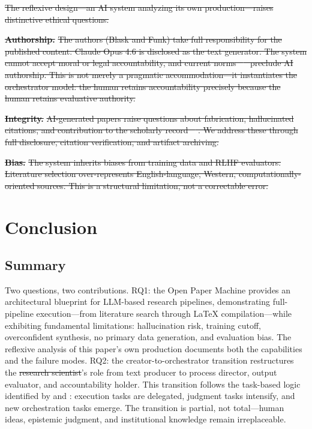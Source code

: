 \documentclass{article}
\providecommand{\DIFaddtex}[1]{{\protect\color{blue}\uwave{#1}}} %
\providecommand{\DIFdeltex}[1]{{\protect\color{red}\sout{#1}}}                      %
\providecommand{\DIFaddbegin}{} %
\providecommand{\DIFaddend}{} %
\providecommand{\DIFdelbegin}{} %
\providecommand{\DIFdelend}{} %
\providecommand{\DIFadd}[1]{\texorpdfstring{\DIFaddtex{#1}}{#1}} %
\providecommand{\DIFdel}[1]{\texorpdfstring{\DIFdeltex{#1}}{}} %
\newcommand{\DIFscaledelfig}{0.5}
\newlength{\DIFdelgraphicswidth} %
\newlength{\DIFdelgraphicsheight} %
\newcommand{\DIFaddincludegraphics}[2][]{{\color{blue}\fbox{\DIFOincludegraphics[#1]{#2}}}} %
\newcommand{\DIFdelincludegraphics}[2][]{%
\sbox{\DIFdelgraphicsbox}{\DIFOincludegraphics[#1]{#2}}%
\settoboxwidth{\DIFdelgraphicswidth}{\DIFdelgraphicsbox} %
\settoboxtotalheight{\DIFdelgraphicsheight}{\DIFdelgraphicsbox} %
\scalebox{\DIFscaledelfig}{%
\parbox[b]{\DIFdelgraphicswidth}{\usebox{\DIFdelgraphicsbox}\\[-\baselineskip] \rule{\DIFdelgraphicswidth}{0em}}\llap{\resizebox{\DIFdelgraphicswidth}{\DIFdelgraphicsheight}{%
\setlength{\unitlength}{\DIFdelgraphicswidth}%
\begin{picture}(1,1)%
\thicklines\linethickness{2pt} %
{\color[rgb]{1,0,0}\put(0,0){\framebox(1,1){}}}%
{\color[rgb]{1,0,0}\put(0,0){\line( 1,1){1}}}%
{\color[rgb]{1,0,0}\put(0,1){\line(1,-1){1}}}%
\end{picture}%
}\hspace*{3pt}}} %
} %
\DeclareRobustCommand{\DIFaddbegin}{\DIFOaddbegin \let\includegraphics\DIFaddincludegraphics} %
\DeclareRobustCommand{\DIFaddend}{\DIFOaddend \let\includegraphics\DIFOincludegraphics} %
\DeclareRobustCommand{\DIFdelbegin}{\DIFOdelbegin \let\includegraphics\DIFdelincludegraphics} %
\DeclareRobustCommand{\DIFdelend}{\DIFOaddend \let\includegraphics\DIFOincludegraphics} %
\begin{document}
\DIFdelbegin \DIFdel{The reflexive design---an AI system analyzing its own production---raises distinctive ethical questions.
}%

\textbf{\DIFdel{Authorship.}} %
\DIFdel{The authors (Blask and Funk) take full responsibility for the published content. Claude Opus 4.6 is disclosed as the text generator. The system cannot accept moral or legal accountability, and current norms \mbox{%
\citep{flanagin2023nonhuman} }\hskip0pt%
preclude AI authorship. This is not merely a pragmatic accommodation---it instantiates the orchestrator model: the human retains accountability precisely because the human retains evaluative authority.
}%

\textbf{\DIFdel{Integrity.}} %
\DIFdel{AI-generated papers raise questions about fabrication, hallucinated citations, and contribution to the scholarly record \mbox{%
\citep{cotton2023cheating,kendall2024risks}}\hskip0pt%
. We address these through full disclosure, citation verification, and artifact archiving.
}%

\textbf{\DIFdel{Bias.}} %
\DIFdel{The system inherits biases from training data and RLHF evaluators. Literature selection over-represents English-language, Western, computationally-oriented sources. This is a structural limitation, not a correctable error.
}%

\DIFdelend %
\section{Conclusion}
\label{sec:conclusion}

\subsection{Summary}

Two questions, two contributions. RQ1: the Open Paper Machine provides an architectural blueprint for LLM-based research pipelines, demonstrating full-pipeline execution---from literature search through \LaTeX{} compilation---while exhibiting fundamental limitations: hallucination risk, training cutoff, overconfident synthesis, no primary data generation, and evaluation bias. The reflexive analysis of this paper's own production documents both the capabilities and the failure modes. RQ2: the creator-to-orchestrator transition restructures the \DIFdelbegin \DIFdel{research scientist}\DIFdelend \DIFaddbegin \DIFadd{researcher}\DIFaddend 's role from text producer to process director, output evaluator, and accountability holder. This transition follows the task-based logic identified by \citet{autor2015why} and \citet{acemoglu2018automation}: execution tasks are delegated, judgment tasks intensify, and new orchestration tasks emerge. The transition is partial, not total---human ideas, epistemic judgment, and institutional knowledge remain irreplaceable.
\end{document}

